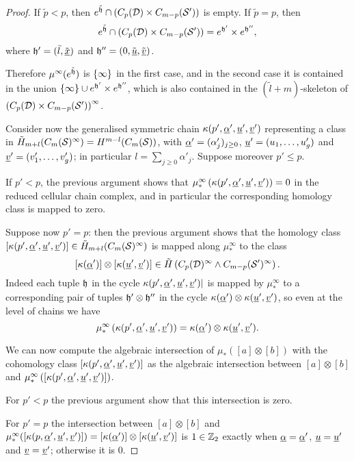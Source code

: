 \begin{proof}
If $\tilde{p}<p$, then
$e^{\tilde{\mathfrak{h}}}\cap (C_p(\mathcal{D})\times C_{m-p}(\mathcal{S}'))$ is empty. If $\tilde{p}=p$, then
\[
e^{\tilde{\mathfrak{h}}}\cap (C_p(\mathcal{D})\times C_{m-p}(\mathcal{S}'))=e^{\mathfrak{h}'}\times e^{\mathfrak{h}''},
\]
where $\mathfrak{h}'=(\tilde{l},\tilde{\underline{x}})$ and $\mathfrak{h}''=(0,\tilde{\underline{u}},\tilde{\underline{v}})$.

Therefore
$\mu^{\infty}(e^{\tilde{\mathfrak{h}}})$ is $\left\{\infty\right\}$ in the first case, and in the second case it
is contained in the union $\left\{\infty\right\}\cup e^{\mathfrak{h}'}\times e^{\mathfrak{h}''}$, which is also
contained in the $(\tilde{l}+m)$-skeleton of $\left(C_p(\mathcal{D})\times C_{m-p}(\mathcal{S}')\right)^{\infty}$.

% 
Consider now the generalised symmetric chain $\kappa(p',\underline{\alpha}',\underline{u}',\underline{v}')$ representing
a class in $\tilde{H}_{m+l}(C_m(\mathcal{S})^{\infty})=H^{m-l}(C_m(\mathcal{S}))$, with $\underline{\alpha}'=(\alpha'_j)_{j\geq 0}$,
$\underline{u}'=(u_1,\dots,u'_g)$ and $\underline{v}'=(v'_1,\dots,v'_g)$; in particular $l=\sum_{j\geq 0}\alpha'_j$.
Suppose moreover $p'\leq p$.

If $p'<p$, the previous argument shows that $\mu^{\infty}_*\left(\kappa(p',\underline{\alpha}',\underline{u}',\underline{v}')\right)=0$
in the reduced cellular chain complex,
and in particular the corresponding homology class is mapped to zero.

Suppose now $p'=p$: then the previous argument shows that
the homology class $[\kappa(p',\underline{\alpha}',\underline{u}',\underline{v}')]\in \tilde{H}_{m+l}(C_m(\mathcal{S})^{\infty})$
is mapped along $\mu^{\infty}_*$ to the class
\[
[\kappa(\underline{\alpha}')]\otimes [\kappa(\underline{u}',\underline{v}')]\in\tilde{H}\left(C_p(\mathcal{D})^{\infty}\wedge C_{m-p}(\mathcal{S}')^{\infty}\right).
\]
Indeed each tuple $\mathfrak{h}$ in the cycle $\kappa(p',\underline{\alpha}',\underline{u}',\underline{v}')|$ is mapped by $\mu^{\infty}_*$
to a corresponding pair of tuples $\mathfrak{h}'\otimes\mathfrak{h}''$ in the cycle $\kappa(\underline{\alpha}')\otimes \kappa(\underline{u}',\underline{v}')$,
so even at the level of chains we have
\[
\mu^{\infty}_*\left(\kappa(p',\underline{\alpha}',\underline{u}',\underline{v}')\right)=\kappa(\underline{\alpha}')\otimes \kappa(\underline{u}',\underline{v}').
\]

We can now compute the algebraic intersection of $\mu_*([a]\otimes [b])$ with
the cohomology class $[\kappa(p',\underline{\alpha}',\underline{u}',\underline{v}')]$ as the algebraic intersection between
$[a]\otimes [b]$ and $\mu^{\infty}_*\left([\kappa(p',\underline{\alpha}',\underline{u}',\underline{v}')]\right)$.

For $p'<p$ the previous argument show that this intersection is zero.

For $p'=p$ the intersection between
$[a]\otimes [b]$ and $\mu^{\infty}_*([\kappa(p,\underline{\alpha}',\underline{u}',\underline{v}')])=[\kappa(\underline{\alpha}')]\otimes [\kappa(\underline{u}',\underline{v}')]$
is $1\in\mathbb{Z}_2$ exactly when $\underline{\alpha}=\underline{\alpha}'$, $\underline{u}=\underline{u}'$ and $\underline{v}=\underline{v}'$; otherwise it is $0$.


\end{proof}
